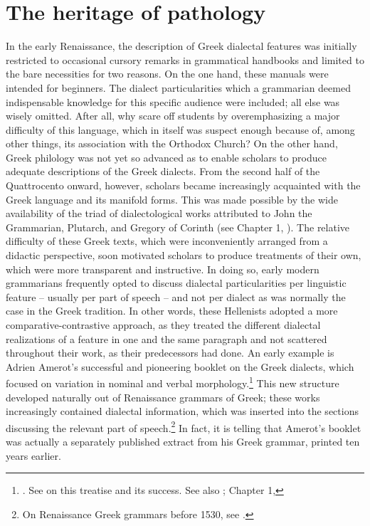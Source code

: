 \section{The heritage of pathology}\label{sec:6.2}

In the early Renaissance, the description of Greek dialectal features was initially restricted to occasional cursory remarks in grammatical handbooks and limited to the bare necessities for two reasons. On the one hand, these manuals were intended for beginners. The dialect particularities which a grammarian deemed indispensable knowledge for this specific audience were included; all else was wisely omitted. After all, why scare off students by overemphasizing a major difficulty of this language, which in itself was suspect enough because of, among other things, its association with the Orthodox Church? On the other hand, Greek philology was not yet so advanced as to enable scholars to produce adequate descriptions of the Greek dialects. From the second half of the Quattrocento onward, however, scholars became increasingly acquainted with the Greek language and its manifold forms. This was made possible by the wide availability of the triad of dialectological works attributed to John the Grammarian, Plutarch, and Gregory of Corinth (see Chapter 1, ). The relative difficulty of these Greek texts, which were inconveniently arranged from a didactic perspective, soon motivated scholars to produce treatments of their own, which were more transparent and instructive. In doing so, early modern grammarians frequently opted to discuss dialectal particularities per linguistic feature – usually per part of speech – and not per dialect as was normally the case in the Greek tradition. In other words, these Hellenists adopted a more comparative-contrastive approach, as they treated the different dialectal realizations of a feature in one and the same paragraph and not scattered throughout their work, as their predecessors had done. An early example is Adrien Amerot’s successful and pioneering booklet on the Greek dialects, which focused on variation in nominal and verbal morphology.\footnote{{\citet{Amerot1530}. See \citet[1--19]{Hoven1985} on this treatise and its success. See also \citet{Hummel1999}; Chapter 1, }} This new structure developed naturally out of Renaissance grammars of Greek; these works increasingly contained dialectal information, which was inserted into the sections discussing the relevant part of speech.\footnote{{On Renaissance Greek grammars before 1530, see \citet{Botley2010}.}} In fact, it is telling that Amerot’s booklet was actually a separately published extract from his Greek grammar, printed ten years earlier.

